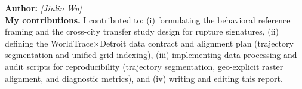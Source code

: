 \noindent\textbf{Author:} \emph{[Jinlin Wu]}\\
\textbf{My contributions.} I contributed to: (i) formulating the behavioral reference framing and the cross-city transfer study design for rupture signatures, (ii) defining the WorldTrace$\times$Detroit data contract and alignment plan (trajectory segmentation and unified grid indexing), (iii) implementing data processing and audit scripts for reproducibility (trajectory segmentation, geo-explicit raster alignment, and diagnostic metrics), and (iv) writing and editing this report.\\
